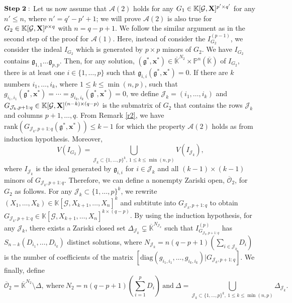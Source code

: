 \documentclass[11pt]{article}
\numberwithin{Property}{section}
\numberwithin{Theorem}{section}
\numberwithin{Proposition}{section}
\numberwithin{Lemma}{section}
\numberwithin{Corollary}{section}
\numberwithin{Definition}{section}
\numberwithin{Remark}{section}
\numberwithin{Conjecture}{section}
\numberwithin{Problem}{section}
\numberwithin{Example}{section}
\numberwithin{Claim}{section}
\renewcommand{\leq}{\leqslant}
\def\bar{\overline}
\newcommand{\field}{\mathbb{K}} %
\newcommand{\mat}[1]{\mathbf{\MakeUppercase{#1}}} %
\begin{document}
$\bf{Step \ 2:}$ Let us now assume that $\mathcal{A}(2)$ holds for any $G_1 \in \field[{\mathcal{G}, \mat{X}}]^{p' \times q'}$ for any $n' \leq n$, where $n' = q'-p'+1$; we will prove $\mathcal{A}(2)$ is also true for $G_2 \in \field[\mathcal{G}, \mat{X}]^{p \times q}$ with $n = q-p+1$. We follow the similar argument as in the second step of the proof for $\mathcal{A}(1)$. Here, instead of consider the $I_{G_2}^{(p-1)}$, we consider the indeal $I_{G_2}$ which is generated by $p \times p$ minors of $G_2$. We have $I_{G_2}$ contains $\mathfrak{g}_{1,1}\ldots \mathfrak{g}_{p,p}$. Then, for any solution, $(\mathfrak{g}^*,\mathbf{x}^*) \in \bar{\field}^{N_2} \times \mathbb{P}^n(\bar{\field})$ of $I_{G_2}$, there is at least one $i \in \{1, \ldots, p\}$ such that $\mathfrak{g}_{i,i}(\mathfrak{g}^*,\mathbf{x}^*) = 0$. If there are $k$ numbers $i_1, \ldots, i_k$, where $1 \leq k \leq \min(n,p)$, such that $g_{i_1, i_1}(\mathfrak{g}^*, \mathbf{x}^*) = \cdots = g_{i_k, i_k}(\mathfrak{g}^*, \mathbf{x}^*) = 0$, we define $\mathcal{J}_k = (i_1, \ldots, i_k)$ and $G_{\mathcal{J}_k, p+1:q} \in \field[\mathcal{G}, \mat{X}]^{(n-k)\times (q-p)}$ is the submatrix of $G_2$ that contains the rows $\mathcal{J}_k$ and columns $p+1, \ldots, q$. From Remark \ref{r2}, we have $\mathrm{rank}(G_{\mathcal{J}_k, p+1:q}(\mathfrak{g}^*, \mathbf{x}^*)) \leq k-1$ for which the property $\mathcal{A}(2)$ holds as from induction hypothesis. Moreover, $$V(I_{G_2}) = \bigcup\limits_{\mathcal{J}_k \subset\{1, \ldots, p\}^k, \ 1 \leq k \leq \min(n,p)} V(I_{\mathcal{J}_k}),$$ where $I_{\mathcal{J}_k}$ is the ideal generated by $\mathfrak{g}_{i,i}$ for $i \in \mathcal{J}_k$ and all $(k-1)\times(k-1)$ minors of $G_{\mathcal{J}_k, p+1:q}$. Therefore, we can define a nonempty Zariski open, $\bar{\mathcal{O}}_2$, for $G_2$ as follows. For any $\mathcal{J}_k \subset \{1, \ldots, p\}^k$, we rewrite $(X_1, \ldots, X_k) \in \field[\mathcal{G}, X_{k+1}, \ldots, X_n]^{k}$ and subtitute into $G_{\mathcal{J}_k, p+1:q}$ to obtain $G_{\mathcal{J}_k, p+1:q} \in \field[\mathcal{G}, X_{k+1}, \ldots, X_n]^{k \times {(q-p)}}$. By using the induction hypothesis, for any $\mathcal{J}_k$, there exists a Zariski closed set $\Delta_{\mathcal{J}_k} \subsetneq \bar{\field}^{N_{\mathcal{J}_k}}$ such that $I_{G_{\mathcal{J}_k, p+1:q}}^{(p)}$ has $S_{n-k}(D_{i_1}, \ldots, D_{i_k})$ distinct solutions, where $N_{\mathcal{J}_k} = n(q-p+1)(\sum_{i \in \mathcal{J}_k}D_i)$ is the number of coefficients of the matrix $[\mathrm{diag}(g_{i_1, i_1}, \ldots, g_{i_k, i_k})|G_{\mathcal{J}_k, p+1:q}]$. We finally, define \[\bar{\mathcal{O}}_2 = \bar{\field}^{N_2} \setminus \Delta, \ \mathrm{where}\  N_2 = n(q-p+1)(\sum_{i=1}^pD_i) \ \mathrm{and} \ \Delta = \bigcup_{\mathcal{J}_k \subset\{1, \ldots, p\}^k, \ 1 \leq k \leq \min(n,p)}\Delta_{\mathcal{J}_k}.\]
\end{document}
